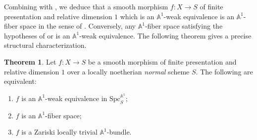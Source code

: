 \documentclass[10pt]{amsart}
\renewcommand{\AA}{\mathbb{A}}
\numberwithin{equation}{section} %
\theoremstyle{plain}
\theoremstyle{definition}
\newtheorem{theorem}[theorem]{Theorem}
\theoremstyle{remark}
\begin{document}
Combining  with , we deduce that a smooth morphism $f:X\to S$ of finite presentation and relative dimension $1$ which is an $\AA^1$-weak equivalence is an $\AA^1$-fiber space in the sense of . Conversely, any $\AA^1$-fiber space satisfying the hypotheses of  or  is an $\AA^1$-weak equivalence. The following theorem gives a precise structural characterization.

\begin{theorem}\label{1-dim DD}
Let $f:X\to S$ be a smooth morphism of finite presentation and relative dimension $1$ over a locally noetherian \emph{normal} scheme $S$. The following are equivalent:
\begin{enumerate}
  \item $f$ is an $\AA^1$-weak equivalence in $\mathrm{Spc}_S^{\AA^1}$;
  \item $f$ is an $\AA^1$-fiber space;
  \item $f$ is a Zariski locally trivial $\AA^1$-bundle. 
\end{enumerate}    
\end{theorem}
\end{document}
